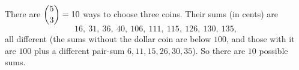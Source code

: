 There are $\dbinom53=10$ ways to choose three coins. Their sums (in cents) are
\[16,\ 31,\ 36,\ 40,\ 106,\ 111,\ 115,\ 126,\ 130,\ 135,\]
all different (the sums without the dollar coin are below $100$, and those with it are $100$ plus a different pair-sum $6,11,15,26,30,35$). So there are $\boxed{10}$ possible sums.
